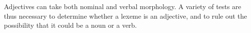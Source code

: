 Adjectives can take both nominal and verbal morphology. A variety of tests are thus necessary to determine whether a lexeme is an adjective, and to rule out the possibility that it could be a noun or a verb.

 
% 
% 
% 
% 
% 
% 
% 
% 
% 
% 
% 
